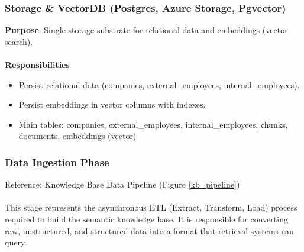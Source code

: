 \subsubsection{Storage \& VectorDB (Postgres, Azure Storage, Pgvector)}

\textbf{Purpose}: Single storage substrate for relational data and embeddings (vector search).
\\\\
\textbf{Responsibilities}
\begin{itemize}
    \item Persist relational data (companies, external\_employees, internal\_employees).
    \item Persist embeddings in vector columns with indexes.
    \item Main tables: companies, external\_employees, internal\_employees, chunks, documents, embeddings (vector)
\end{itemize}

\newpage

\subsubsection{Data Ingestion Phase}
Reference: Knowledge Base Data Pipeline (Figure \ref{kb_pipeline})
\\\\
This stage represents the asynchronous ETL (Extract, Transform, Load) process required to build the semantic knowledge base. It is responsible for converting raw, unstructured, and structured data into a format that retrieval systems can query.

